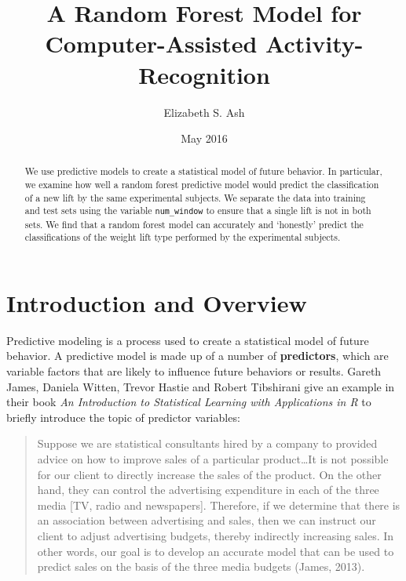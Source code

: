 \documentclass[12pt,twoside]{reedthesis}
\title{A Random Forest Model for Computer-Assisted Activity-Recognition}
\author{Elizabeth S. Ash}
\date{May 2016}
\begin{document}
      \maketitle
  
  \frontmatter %
  \pagestyle{empty} %

  
  

      \hypersetup{linkcolor=black}
    \setcounter{tocdepth}{4}
    \tableofcontents
  
      \listoftables
  
      \listoffigures
  
      \begin{abstract}
      We use predictive models to create a statistical model of future
      behavior. In particular, we examine how well a random forest predictive
      model would predict the classification of a new lift by the same
      experimental subjects. We separate the data into training and test sets
      using the variable \texttt{num\_window} to ensure that a single lift is
      not in both sets. We find that a random forest model can accurately and
      `honestly' predict the classifications of the weight lift type performed
      by the experimental subjects.
    \end{abstract}
  
  
  \mainmatter %
  \pagestyle{fancyplain} %

  \chapter*{Introduction and Overview}\label{introduction-and-overview}
  
  Predictive modeling is a process used to create a statistical model of
  future behavior. A predictive model is made up of a number of
  \textbf{predictors}, which are variable factors that are likely to
  influence future behaviors or results. Gareth James, Daniela Witten,
  Trevor Hastie and Robert Tibshirani give an example in their book
  \emph{An Introduction to Statistical Learning with Applications in R} to
  briefly introduce the topic of predictor variables:
  
  \begin{quote}
  Suppose we are statistical consultants hired by a company to provided
  advice on how to improve sales of a particular product\ldots{}It is not
  possible for our client to directly increase the sales of the product.
  On the other hand, they can control the advertising expenditure in each
  of the three media {[}TV, radio and newspapers{]}. Therefore, if we
  determine that there is an association between advertising and sales,
  then we can instruct our client to adjust advertising budgets, thereby
  indirectly increasing sales. In other words, our goal is to develop an
  accurate model that can be used to predict sales on the basis of the
  three media budgets (James, 2013).
  \end{quote}
  
\end{document}
